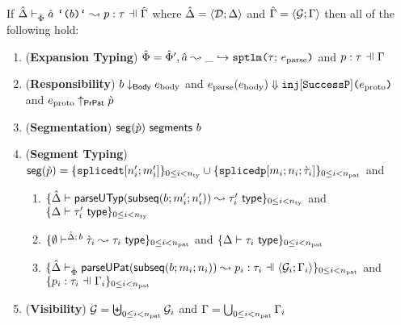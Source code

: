 \documentclass[acmsmall,screen]{acmart}
\begin{document}
\begin{theorem}
\label{thm:spTLM-Typing-Segmentation}
If $\patExpands{\upctx}{\uPhi}{\utsmap{\tsmv}{b}}{p}{\tau}$ where $\hat{\Delta}=\langle \mathcal{D}; \Delta \rangle$ and $\hat{\Gamma}=\langle \mathcal{G}; \Gamma \rangle$ then all of the following hold:
\begin{enumerate}[nolistsep,leftmargin=10pt,label={\arabic*.}]
        \item (\textbf{Expansion Typing}) $\hat\Phi=\hat\Phi', \hat{a} \leadsto \_ \hookrightarrow \texttt{sptlm}\texttt{(}\tau;\,e_\text{parse}\texttt{)}$ and $\patType{\pctx}{p}{\tau}$
        \item (\textbf{Responsibility}) $b \downarrow_\mathsf{Body} e_\text{body}$ and $e_\text{parse}(e_\text{body}) \Downarrow \texttt{inj}[\mathtt{SuccessP}]\texttt{(}e_\text{proto}\texttt{)}$ and $e_\text{proto} \uparrow_\mathsf{PrPat} \grave{p}$
        \item (\textbf{Segmentation}) $\mathsf{seg}(\grave{p})~\mathsf{segments}~b$
        \item (\textbf{Segment Typing}) $\mathsf{seg}(\grave{p}) = \{\texttt{splicedt}[n'_i; m'_i]\}_{0 \leq i < n_\text{ty}} \cup \{\texttt{splicedp}[m_i; n_i; \grave{\tau}_i]\}_{0 \leq i < n_\text{pat}}$ and
          \begin{enumerate}
          \item $\{
                \hat{\Delta} \vdash 
                  \mathsf{parseUTyp}(\mathsf{subseq}(b; m'_i; n'_i))
                 \leadsto \tau'_i~\mathsf{type}
              \}_{0 \leq i < n_\text{ty}}$ and $\{\Delta \vdash \tau'_i~\mathsf{type}\}_{0 \leq i < n_\text{ty}}$
          \item $\{
            \emptyset\vdash^{
              \hat{\Delta};\,b
            } 
              \grave{\tau}_i
             \leadsto \tau_i~\mathsf{type}
          \}_{0 \leq i < n_\text{pat}}$ and $\{\Delta \vdash \tau_i~\mathsf{type}\}_{0 \leq i < n_\text{pat}}$
          \item $\sseq{
            \patExpands
              {\uGG{\uG_i}{\pctx_i}}
              {\uPhi}
              {\parseUPatF{\bsubseq{b}{m_i}{n_i}}}
              {p_i}
              {\tau_i}
          }{\npat}$  and $\sseq{\patType{\pctx_i}{p_i}{\tau_i}}{\npat}$
          \end{enumerate}
      \item (\textbf{Visibility}) $\mathcal{G} = \biguplus_{0 \leq i < n_\text{pat}} \mathcal{G}_i$ and $\Gamma = \bigcup_{0 \leq i < n_\text{pat}} \Gamma_i$
\end{enumerate}
\end{theorem}


\end{document}
